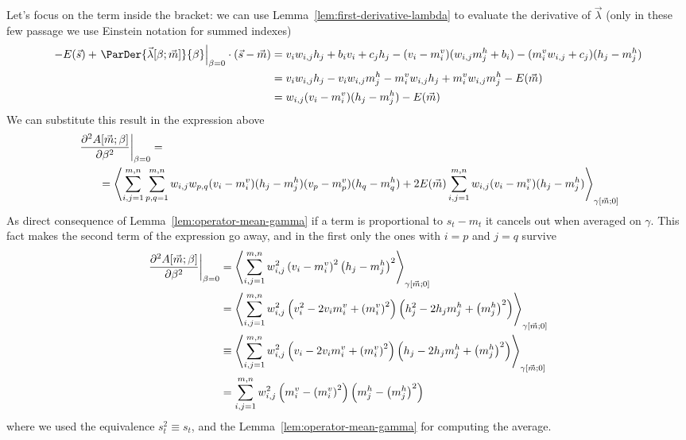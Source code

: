 Let's focus on the term inside the bracket: we can use Lemma~\ref{lem:first-derivative-lambda}
to evaluate the derivative of \(\vec{\lambda}\) (only in these few passage we use Einstein notation
for summed indexes)
\begin{align*}
  -E{(\vec{s})} + \left.\ParDer{\Lambd{\beta}{\vec{m}}}{\beta}\right|_{\beta=0}\cdot(\vec{s}-\vec{m})
  &= v_iw_{i,j}h_j +b_iv_i+c_jh_j - (v_i-\mvi)(w_{i,j}\mhj +b_i) - (\mvi w_{i,j}+c_j)(h_j-\mhj) \\
  &= v_iw_{i,j}h_j - v_i w_{i,j} \mhj - \mvi w_{i,j} h_j + \mvi w_{i,j} \mhj - E{(\vec{m})}\\
  &= w_{i,j} (v_i-\mvi)(h_j-\mhj) - E{(\vec{m})}
\end{align*}
We can substitute this result in the expression above
\begin{align*}
  &\left.\frac{\partial^2A{\left[\vec{m};\beta\right]}}{\partial\beta^2}\right|_{\beta=0}=\\
  &\qquad= \left\langle
      \sum_{i,j=1}^{m,n}\sum_{p,q=1}^{m,n} w_{i,j} w_{p,q}(v_i-m_i^v)(h_j-m_j^h)(v_p-m_p^v)(h_q-m_q^h)
      +2E{(\vec{m})}\sum_{i,j=1}^{m,n}w_{i,j}(v_i-m_i^v)(h_j-m_j^h)
    \right\rangle_{\gamma{\left[\vec{m};0\right]}}
\end{align*}
As direct consequence of Lemma~\ref{lem:operator-mean-gamma} if a term is proportional to \(s_t-m_t\)
it cancels out when averaged on \(\gamma\). This fact makes the second term of the expression go away,
and in the first only the ones with \(i=p\) and \(j=q\) survive
\begin{align*}
  \left.\frac{\partial^2A{\left[\vec{m};\beta\right]}}{\partial\beta^2}\right|_{\beta=0}
    &=\left\langle\sum_{i,j=1}^{m,n} w_{i,j}^2\left(v_i-m_i^v\right)^2\left(h_j-m_j^h\right)^2\right\rangle_{\gamma{\left[\vec{m};0\right]}} \\
    &=\left\langle\sum_{i,j=1}^{m,n} w_{i,j}^2\left(v_i^2 -2v_im_i^v+{\left(m_i^v\right)}^2\right)\left(h_j^2-2h_jm_j^h +{\left(m_j^h\right)}^2\right)\right\rangle_{\gamma{\left[\vec{m};0\right]}}\\
    &\equiv\left\langle\sum_{i,j=1}^{m,n} w_{i,j}^2\left(v_i-2v_im_i^v+{\left(m_i^v\right)}^2\right)\left(h_j-2h_jm_j^h +{\left(m_j^h\right)}^2\right)\right\rangle_{\gamma{\left[\vec{m};0\right]}}\\
    &=\sum_{i,j=1}^{m,n} w_{i,j}^2\left(m_i^v-{\left(m_i^v\right)}^2\right)\left(m_j^h-{\left(m_j^h\right)}^2\right)
\end{align*}
where we used the equivalence \(s_t^2 \equiv s_t\), and the Lemma~\ref{lem:operator-mean-gamma}
for computing the average.

